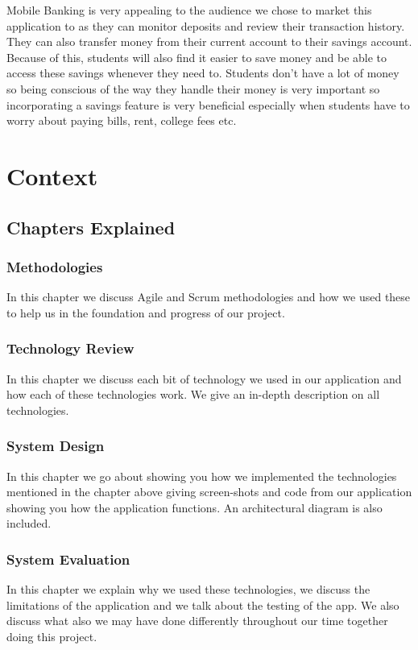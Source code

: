 Mobile Banking is very appealing to the audience we chose to market this application to as they can monitor deposits and review their transaction history. They can also transfer money from their current account to their savings account. Because of this, students will also find it easier to save money and be able to access these savings whenever they need to. Students don’t have a lot of money so being conscious of the way they handle their money is very important so incorporating a savings feature is very beneficial especially when students have to worry about paying bills, rent, college fees etc.





\chapter{Context}

\section{Chapters Explained}
\subsection{Methodologies}
In this chapter we discuss Agile and Scrum methodologies and how we used these to help us in the foundation and progress of our project.

\subsection{Technology Review}
In this chapter we discuss each bit of technology we used in our application and how each of these technologies work. We give an in-depth description on all technologies.

\subsection{System Design}
In this chapter we go about showing you how we implemented the technologies mentioned in the chapter above giving screen-shots and code from our application showing you how the application functions. An architectural diagram is also included.

\subsection{System Evaluation}
In this chapter we explain why we used these technologies, we discuss the limitations of the application and we talk about the testing of the app. We also discuss what also we may have done differently throughout our time together doing this project.

